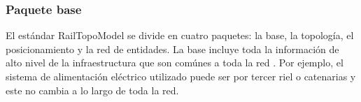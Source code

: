 \subsubsection{Paquete base}

    El estándar RailTopoModel se divide en cuatro paquetes: la base, la topología, el posicionamiento y la red de entidades. La base incluye toda la información de alto nivel de la infraestructura que son comúnes a toda la red \cite{Paper_146}. Por ejemplo, el sistema de alimentación eléctrico utilizado puede ser por tercer riel o catenarias y este no cambia a lo largo de toda la red.
